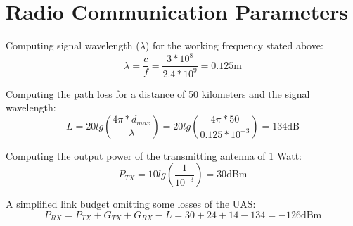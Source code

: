 \section*{Radio Communication Parameters}

Computing signal wavelength ($\lambda$) for the working frequency stated above:
\begin{equation*}\label{eq:tech_parameters3}
	\lambda = \frac{c}{f} = \frac{3*10^{8}}{2.4*10^{9}} = 0.125 \text{m}
\end{equation*}

Computing the path loss for a distance of 50 kilometers and the signal wavelength:
\begin{equation*}\label{eq:tech_parameters4}
	L = 20lg\left (\frac{4\pi*d_{max}}{\lambda} \right)
	  = 20lg\left (\frac{4\pi*50}{0.125*10^{-3}} \right)
	  = 134 \text{dB} 
\end{equation*}


Computing the output power of the transmitting antenna of 1 Watt:
\begin{equation*}\label{eq:tech_parameters3}
	P_{TX} = 10lg\left (\frac{1}{10^{-3}} \right)  
	       = 30 \text{dBm}
\end{equation*}


A simplified link budget omitting some losses of the UAS:
\begin{equation*}\label{eq:tech_parameters3}
	P_{RX} = P_{TX} + G_{TX} + G_{RX} - L  
	       = 30 + 24 + 14 - 134 = -126 \text{dBm}
\end{equation*}

